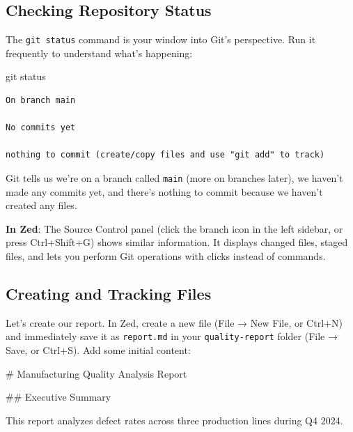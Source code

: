 \documentclass[
  letterpaper,
  DIV=11,
  numbers=noendperiod]{scrreprt}
\newenvironment{Shaded}{\begin{snugshade}}{\end{snugshade}}
\newcommand{\FunctionTok}[1]{\textcolor[rgb]{0.28,0.35,0.67}{#1}}
\newcommand{\NormalTok}[1]{\textcolor[rgb]{0.00,0.23,0.31}{#1}}
\begin{document}
\subsection{Checking Repository
Status}\label{checking-repository-status}

The \texttt{git\ status} command is your window into Git's perspective.
Run it frequently to understand what's happening:

\begin{codelisting}

\caption{\texttt{terminal}}

\begin{Shaded}
\begin{Highlighting}[]
\FunctionTok{git}\NormalTok{ status}
\end{Highlighting}
\end{Shaded}

\end{codelisting}

\begin{verbatim}
On branch main

No commits yet

nothing to commit (create/copy files and use "git add" to track)
\end{verbatim}

Git tells us we're on a branch called \texttt{main} (more on branches
later), we haven't made any commits yet, and there's nothing to commit
because we haven't created any files.

\textbf{In Zed}: The Source Control panel (click the branch icon in the
left sidebar, or press Ctrl+Shift+G) shows similar information. It
displays changed files, staged files, and lets you perform Git
operations with clicks instead of commands.

\subsection{Creating and Tracking
Files}\label{creating-and-tracking-files}

Let's create our report. In Zed, create a new file (File → New File, or
Ctrl+N) and immediately save it as \texttt{report.md} in your
\texttt{quality-report} folder (File → Save, or Ctrl+S). Add some
initial content:

\begin{codelisting}

\caption{\texttt{report.md}}

\begin{Shaded}
\begin{Highlighting}[]
\FunctionTok{\# Manufacturing Quality Analysis Report}

\FunctionTok{\#\# Executive Summary}

\NormalTok{This report analyzes defect rates across three production lines}
\NormalTok{during Q4 2024.}
\end{Highlighting}
\end{Shaded}

\end{codelisting}
\end{document}
